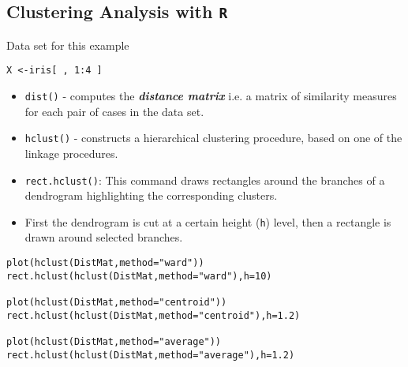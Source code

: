 \documentclass[]{article}
\title{}
\author{}
\begin{document}
\maketitle

\begin{abstract}

\end{abstract}


\subsection{Clustering Analysis with \texttt{R}}
\Large
Data set for this example
\begin{framed}
\begin{verbatim}
X <-iris[ , 1:4 ]

\end{verbatim}
\end{framed}




\Large
\begin{itemize}
\item \texttt{dist()} - computes the \textit{\textbf{distance matrix}} i.e. a matrix of similarity measures for each pair of cases in the data set.
\vspace{0.3cm}
\item \texttt{hclust()} - constructs a hierarchical clustering procedure, based on one of the linkage procedures.
\vspace{0.3cm}
\end{itemize}


\begin{itemize}

\item \texttt{rect.hclust()}: This command draws rectangles around the branches of a dendrogram highlighting the corresponding clusters. \item First the dendrogram is cut at a certain height (\texttt{h}) level, then a rectangle is drawn around selected branches.
\end{itemize}


\begin{framed}
\begin{verbatim}
plot(hclust(DistMat,method="ward"))
rect.hclust(hclust(DistMat,method="ward"),h=10)

plot(hclust(DistMat,method="centroid"))
rect.hclust(hclust(DistMat,method="centroid"),h=1.2)

plot(hclust(DistMat,method="average"))
rect.hclust(hclust(DistMat,method="average"),h=1.2)
\end{verbatim}
\end{framed}
\end{document}
